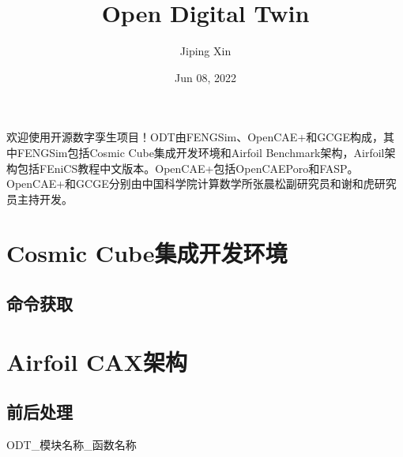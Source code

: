 \documentclass[letterpaper,10pt,english]{sphinxmanual}
\title{Open Digital Twin}
\date{Jun 08, 2022}
\author{Jiping Xin}
\let\sphinxpxdimen\pdfpxdimen\else\newdimen\sphinxpxdimen
\begin{document}
\pagestyle{empty}
\sphinxmaketitle
\pagestyle{plain}
\sphinxtableofcontents
\pagestyle{normal}
\label{\detokenize{index::doc}}
\sphinxstepscope



\sphinxAtStartPar
欢迎使用开源数字孪生项目！ODT由FENGSim、OpenCAE+和GCGE构成，其中FENGSim包括Cosmic Cube集成开发环境和Airfoil Benchmark架构，Airfoil架构包括FEniCS教程中文版本。OpenCAE+包括OpenCAEPoro和FASP。OpenCAE+和GCGE分别由中国科学院计算数学所张晨松副研究员和谢和虎研究员主持开发。

\sphinxstepscope


\chapter{Cosmic Cube集成开发环境}
\label{\detokenize{src/cosmiccube/main:cosmic-cube}}\label{\detokenize{src/cosmiccube/main::doc}}
\sphinxstepscope


\section{命令获取}
\label{\detokenize{src/cosmiccube/cosmiccube:id1}}\label{\detokenize{src/cosmiccube/cosmiccube::doc}}
\begin{sphinxVerbatim}[commandchars=\\\{\}]
  
\end{sphinxVerbatim}

\noindent\sphinxincludegraphics[width=400\sphinxpxdimen]{{cosmiccube}.jpg}

\sphinxstepscope


\chapter{Airfoil CAX架构}
\label{\detokenize{src/airfoil/main:airfoil-cax}}\label{\detokenize{src/airfoil/main::doc}}
\sphinxstepscope


\section{前后处理}
\label{\detokenize{src/airfoil/airfoil_prepost:id1}}\label{\detokenize{src/airfoil/airfoil_prepost::doc}}
\sphinxAtStartPar
ODT\_模块名称\_函数名称
\end{document}
